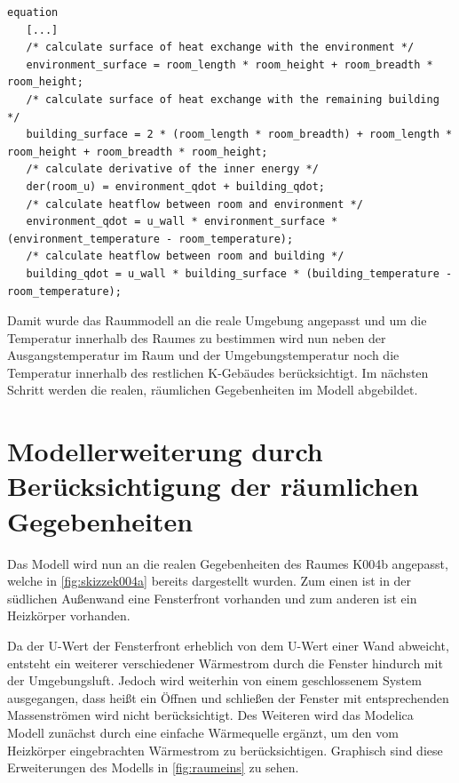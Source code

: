 \begin{lstlisting}[language=Modelica, caption={Erweitertes Gleichungssystem Modell des Raumes unter Berücksichtigung der realen Umgebung in Modelica}, label=lst:raumeins]
equation
   [...]
   /* calculate surface of heat exchange with the environment */
   environment_surface = room_length * room_height + room_breadth * room_height;
   /* calculate surface of heat exchange with the remaining building */
   building_surface = 2 * (room_length * room_breadth) + room_length * room_height + room_breadth * room_height;
   /* calculate derivative of the inner energy */
   der(room_u) = environment_qdot + building_qdot;
   /* calculate heatflow between room and environment */
   environment_qdot = u_wall * environment_surface * (environment_temperature - room_temperature);
   /* calculate heatflow between room and building */
   building_qdot = u_wall * building_surface * (building_temperature - room_temperature);
\end{lstlisting}

Damit wurde das Raummodell an die reale Umgebung angepasst und um die Temperatur innerhalb des Raumes zu bestimmen wird nun neben der Ausgangstemperatur im Raum und der Umgebungstemperatur noch die Temperatur innerhalb des restlichen K-Gebäudes berücksichtigt. Im nächsten Schritt werden die realen, räumlichen Gegebenheiten im Modell abgebildet.


\section{Modellerweiterung durch Berücksichtigung der räumlichen Gegebenheiten}

Das Modell wird nun an die realen Gegebenheiten des Raumes K004b angepasst, welche in \ref{fig:skizzek004a} bereits dargestellt wurden. Zum einen ist in der südlichen Außenwand eine Fensterfront vorhanden und zum anderen ist ein Heizkörper vorhanden. 

Da der U-Wert der Fensterfront erheblich von dem U-Wert einer Wand abweicht, entsteht ein weiterer verschiedener Wärmestrom durch die Fenster hindurch mit der Umgebungsluft. Jedoch wird weiterhin von einem geschlossenem System ausgegangen, dass heißt ein Öffnen und schließen der Fenster mit entsprechenden Massenströmen wird nicht berücksichtigt. Des Weiteren wird das Modelica Modell zunächst durch eine einfache Wärmequelle ergänzt, um den vom Heizkörper eingebrachten Wärmestrom zu berücksichtigen. Graphisch sind diese Erweiterungen des Modells in \ref{fig:raumeins} zu sehen. 

